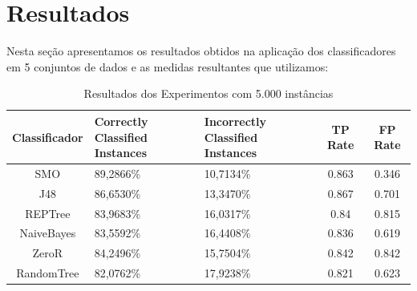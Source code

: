 \documentclass[
	12pt,				%
	openright,			%
	oneside,	
	a4paper,				%
	english,				%
	brazil				%
]{abntex2/abntex2} %
\begin{document}
	\section{Resultados}
	
	Nesta seção apresentamos os resultados obtidos na aplicação dos classificadores em  5  conjuntos de dados e as medidas resultantes que utilizamos:
	
		
		\begin{table}[htbp]
			\centering
			\caption{Resultados dos Experimentos com 5.000 instâncias}
			\label{tabResultadosExperimentos5k}
			\begin{center}
	\renewcommand{\arraystretch}{2}
	\begin{tabular}{cp{3cm}p{3.2cm}cc}
		\hline
		\textbf{Classificador}                & \textbf{Correctly Classified Instances}               & \textbf{Incorrectly Classified Instances}      	& \textbf{TP Rate}						&\textbf{FP Rate}   \\ \hline
		SMO                                      & 89,2866\%                                                                                 & 10,7134\% 							&0.863									&0.346                                                                                    \\
		J48                                      & 86,6530\%                                                                                  & 13,3470\% 							&0.867										&0.701                                                                                     \\
		REPTree                                  & 83,9683\%                                                                                 & 16,0317\%								&0.84											&0.815                                                                                     \\
		NaiveBayes                               & 83,5592\%                                                                                 & 16,4408\%								&0.836												&0.619                                                                                     \\ \hline \hline
		ZeroR    									& 84,2496\%                                                 									& 15,7504\%								&0.842											&0.842                                                     								\\
		RandomTree                               & 82,0762\%                                                                                 & 17,9238\%									&0.821												&0.623                                                                                     \\ \hline
	\end{tabular}
\end{center}
\end{table}
		
\end{document}
